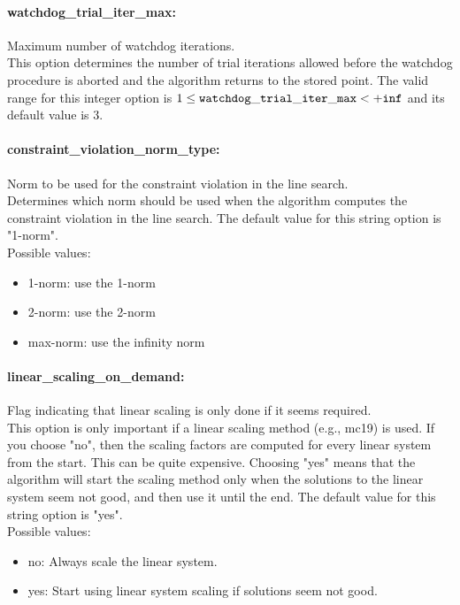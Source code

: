 \paragraph{watchdog\_trial\_iter\_max:}\label{sec:watchdog_trial_iter_max} Maximum number of watchdog iterations. $\;$ \\
 This option determines the number of trial
iterations allowed before the watchdog procedure
is aborted and the algorithm returns to the
stored point. The valid range for this integer option is
$1 \le {\tt watchdog\_trial\_iter\_max } <  {\tt +inf}$
and its default value is $3$.


\paragraph{constraint\_violation\_norm\_type:}\label{sec:constraint_violation_norm_type} Norm to be used for the constraint violation in the line search. $\;$ \\
 Determines which norm should be used when the
algorithm computes the constraint violation in
the line search.
The default value for this string option is "1-norm".
\\ 
Possible values:
\begin{itemize}
   \item 1-norm: use the 1-norm
   \item 2-norm: use the 2-norm
   \item max-norm: use the infinity norm
\end{itemize}

\paragraph{linear\_scaling\_on\_demand:}\label{sec:linear_scaling_on_demand} Flag indicating that linear scaling is only done if it seems required. $\;$ \\
 This option is only important if a linear scaling
method (e.g., mc19) is used.  If you choose "no",
then the scaling factors are computed for every
linear system from the start.  This can be quite
expensive. Choosing "yes" means that the
algorithm will start the scaling method only when
the solutions to the linear system seem not good,
and then use it until the end.
The default value for this string option is "yes".
\\ 
Possible values:
\begin{itemize}
   \item no: Always scale the linear system.
   \item yes: Start using linear system scaling if solutions
seem not good.
\end{itemize}

